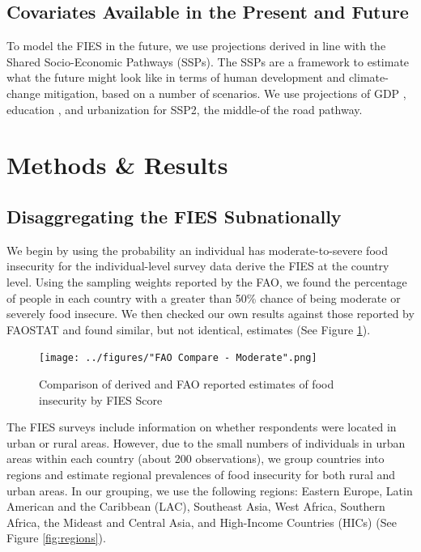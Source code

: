 \documentclass{article}
\begin{document}
\subsection{Covariates Available in the Present and Future}
To model the FIES in the future, we use projections derived in line with the Shared Socio-Economic Pathways (SSPs).  The SSPs are a framework to estimate what the future might look like in terms of human development and climate-change mitigation, based on a number of scenarios.  We use projections of GDP \cite{Dellink2017}, education \cite{KC2017}, and urbanization \cite{Jiang2017} for SSP2, the middle-of the road pathway.

\section{Methods \& Results}
\subsection{Disaggregating the FIES Subnationally}
We begin by using the probability an individual has moderate-to-severe food insecurity for the individual-level survey data derive the FIES at the country level.  Using the sampling weights reported by the FAO, we found the percentage of people in each country with a greater than 50\% chance of being moderate or severely food insecure. We then checked our own results against those reported by FAOSTAT and found similar, but not identical, estimates (See Figure \ref{fig:comparison}).

\begin{figure}[h]
	\centering
	\texttt{[image: ../figures/"FAO Compare - Moderate".png]}
	\caption{Comparison of derived and FAO reported estimates of food insecurity by FIES Score}
	\label{fig:comparison}
\end{figure}

The FIES surveys include information on whether respondents were located in urban or rural areas.  However, due to the small numbers of individuals in urban areas within each country (about 200 observations), we group countries into regions and estimate regional prevalences of food insecurity for both rural and urban areas.  In our grouping, we use the following regions: Eastern Europe, Latin American and the Caribbean (LAC), Southeast Asia, West Africa, Southern Africa, the Mideast and Central Asia, and High-Income Countries (HICs) (See Figure \ref{fig:regions}).
\end{document}
